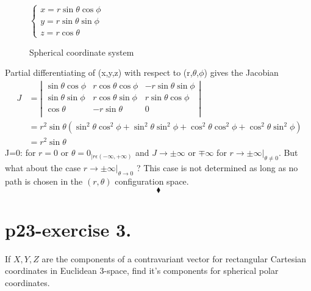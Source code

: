 \begin{figure}[h]
\centering
\begin{minipage}[t]{.6\textwidth}
\vspace{0pt}

\end{minipage}\hfill
\begin{minipage}[t]{0.3\textwidth}
\vspace{50pt}
$\left\{ \begin{array}{c}
    x= r\sin \theta \cos \phi \\
     y= r\sin \theta\sin \phi \\
      z= r\cos\theta 
  \end{array} \right.$
\end{minipage}
\caption{Spherical coordinate system}
\label{fig:fig_p23_117_a}
\end{figure}
Partial differentiating of (x,y,z) with respect to (r,$\theta$,$\phi$) gives the Jacobian
\begin{align}
\ J&=
\left| {\begin{array}{ccc}
    \sin \theta \cos \phi & r\cos \theta\cos \phi  & -r\sin \theta \sin \phi\\
    \sin \theta \sin \phi & r\cos \theta\sin \phi  & r\sin\theta \cos\phi\\
    \cos\theta  & -r\sin \theta &0\\
  \end{array} } \right|
  \\
\ &= r^2\sin \theta (\sin^2 \theta\cos^2 \phi + \sin^2 \theta \sin^2 \phi + \cos^2\theta \cos^2\phi + \cos^2\theta\sin^2\phi)\\
\  &= r^2\sin \theta 
\end{align}
J=0: for $r=0$ or $\theta = 0_{|r \epsilon (-\infty, +\infty)}$ and $J\rightarrow \pm\infty$ or $\mp\infty$ for $r\rightarrow \pm\infty|_{\theta\neq 0}$. But what about the case $r\rightarrow \pm\infty|_{\theta\rightarrow 0}$ ? This case is not determined as long as no path is chosen in the $(r,\theta)$ configuration space.
$$\blacklozenge$$
\pagebreak[4]

\section{p23-exercise 3.}
\begin{tcolorbox}
If $X, Y,Z$ are the components of a contravariant vector for rectangular Cartesian coordinates in Euclidean 3-space, find it's components for spherical polar coordinates.
\end{tcolorbox}

